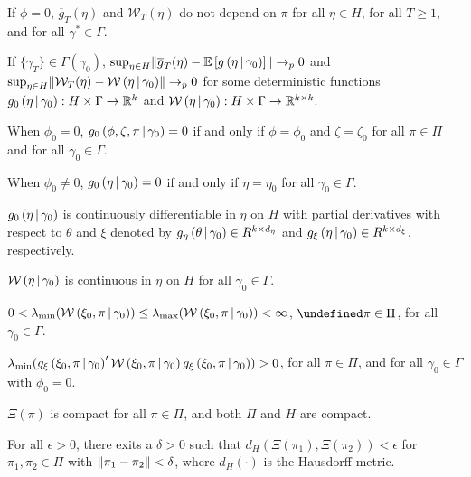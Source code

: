 \documentclass[11pt]{article}
\newcommand*{\R}{\mathbb{R}}
\newcommand*{\W}{\mathcal{W}}
\newcommand*{\E}{\mathbb{E}}
\newcommand*{\pto}{\ensuremath{\to_p}}
\newcommand*{\Eta}{H}
\newcommand*{\sampmom}{\ensuremath{\overline{g}_T}}
\DeclarePairedDelimiter\norm{\lVert}{\rVert}
\let\oldforall\forall
\let\forall\undefined
\DeclareMathOperator{\forall}{\oldforall}
\newcommand{\mvert}[1][\middle]{\ensuremath{\,#1\vert\,}}
\begin{document}
\begin{assump}[GMM 1]\label{ass:GMM1}
\begin{assumplist}
    \item If $\phi=0$, $\sampmom(\eta)$ and $\W_{T}(\eta)$ do not depend on $\pi$ for all $\eta \in \Eta$, for
        all $T \geq 1$, and for all $\gamma^{*}\in \Gamma.$ 
        \label{ass:GMM1a}
    \item If $\lbrace \gamma_{T} \rbrace \in \Gamma\left(\gamma_0\right)$, $\sup_{\eta \in \Eta}
        \norm*{\sampmom(\eta) - \E\left[g\left(\eta \mvert \gamma_0\right)\right]} \pto 0$ and $\sup_{\eta
        \in \Eta} \norm{\W_{T}(\eta)-\W\left(\eta \mvert \gamma_0\right)} \pto 0$ for some deterministic
        functions $g_0\left(\eta \mvert \gamma_0\right) : \Eta \times \Gamma \to \R^{k}$ and
        $\W\left(\eta \mvert \gamma_0\right) : \Eta \times \Gamma \to \R^{k\times k}.$
        \label{ass:GMM1b}
    \item When $\phi_0=0$,  $g_0\left(\phi, \zeta ,\pi \mvert \gamma_0\right) = 0$ if and only if $\phi =\phi_0$
        and $\zeta = \zeta_0$ for all $\pi \in \Pi$ and for all $\gamma_0 \in \Gamma.$
        \label{ass:GMM1c}
    \item When $\phi_0 \neq 0$, $g_0\left(\eta \mvert \gamma_0\right)=0$ if and only if $\eta =\eta_0$ for all 
        $\gamma_0 \in \Gamma.$
        \label{ass:GMM1d}
    \item  $g_0\left(\eta \mvert \gamma_0\right)$ is continuously differentiable in $\eta $ on $\Eta$ with partial
        derivatives with respect to $\theta$ and $\xi$ denoted by $g_{\eta }\left(\theta \mvert
        \gamma_0\right) \in R^{k\times d_{\eta }}$ and $g_{\xi }\left(\eta \mvert \gamma_0\right)\in R^{k\times
        d_{\xi }}$, respectively.
        \label{ass:GMM1e}
    \item $\W\left(\eta \mvert \gamma_0\right)$ is continuous in $\eta$ on $\Eta$ for all $\gamma_0\in \Gamma$.
        \label{ass:GMM1f}
    \item $0 < \lambda_{\min}(\W\left(\xi_0, \pi \mvert \gamma_0\right))\leq \lambda_{\max }(\W\left(\xi_0,\pi
        \mvert \gamma_0\right)) < \infty$, $\forall \pi \in \Pi$, for all $\gamma_0 \in \Gamma$.
        \label{ass:GMM1g}
    \item $\lambda_{\min} (g_{\xi}\left(\xi_0,\pi \mvert \gamma_0\right)^{\prime} \W\left(\xi_0,\pi \mvert
        \gamma_0\right)g_{\xi }\left(\xi_0,\pi \mvert \gamma_0\right))>0$, for all $\pi \in \Pi$,  and for all 
        $\gamma_0 \in \Gamma$ with $\phi_0=0.$
        \label{ass:GMM1h}
    \item$\Xi(\pi)$ is compact for all $\pi \in \Pi$, and both $\Pi$ and $\Eta$ are compact.
        \label{ass:GMM1i}
    \item For all $\epsilon > 0$, there exits a $\delta > 0$ such that $d_{H}\left(\Xi \left(\pi_{1}\right), \Xi
        \left( \pi_{2}\right) \right) < \epsilon$ for $\pi_{1}, \pi_{2} \in \Pi$ with $\norm*{\pi_{1}-\pi_{2}} <
        \delta$, where $d_{H}\left( \cdot \right)$ is the Hausdorff metric.
        \label{ass:GMM1j}
\end{assumplist}
\end{assump}
\end{document}
